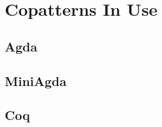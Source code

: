 \section{Copatterns In Use}
\label{sec:copatterns-in-use}

\subsection{Agda}

\subsection{MiniAgda}

\subsection{Coq}

